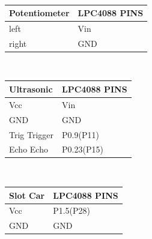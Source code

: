 \documentclass{article}
\begin{document}
\\[1in]
\begin{tabular}{| C{5cm} | C{5cm} |}
\hline
Potentiometer&LPC4088 PINS\\
\hline
left & Vin\\
\hline
right & GND\\
\hline
\end{tabular}
\\[1in]
\begin{tabular}{| C{5cm} | C{5cm} |}
\hline
Ultrasonic&LPC4088 PINS\\
\hline
Vcc & Vin\\
\hline
GND & GND\\
\hline
Trig Trigger & P0.9(P11)\\
\hline
Echo Echo & P0.23(P15)\\
\hline
\end{tabular}
\\[1in]
\begin{tabular}{| C{5cm} | C{5cm} |}
\hline
Slot Car&LPC4088 PINS\\
\hline
Vcc & P1.5(P28)\\
\hline
GND & GND\\
\hline
\end{tabular}
\\
\end{document}
